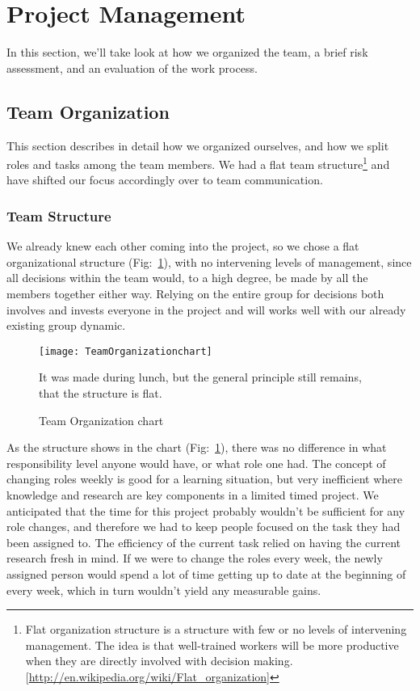 \section{Project Management}\label{Project Management} 
    In this section, we'll take look at how we organized the team, a brief risk assessment, and an evaluation of the work process. 
    
    \subsection{Team Organization}\label{Team Organization} 
        This section describes in detail how we organized ourselves, and how we split roles and tasks among the team members. We had a flat team structure\footnote{Flat organization structure is a structure with few or no levels of intervening management. The idea is that well-trained workers will be more productive when they are directly involved with decision making. [\url{http://en.wikipedia.org/wiki/Flat_organization}]}  and have shifted our focus accordingly over to team communication. 
    
    \subsubsection{Team Structure}\label{Team Structure}
    We already knew each other coming into the project, so we chose a flat organizational structure (Fig:~\ref{fig:TeamOrganizationchart}), with no intervening levels of management, since all decisions within the team would, to a high degree, be made by all the members together either way. Relying on the entire group for decisions both involves and invests everyone in the project and will works well with our already existing group dynamic.

    \begin{figure}[H]
        \centering
        \texttt{[image: TeamOrganizationchart]}
        \caption{Team Organization chart}
        It was made during lunch, but the general principle still remains, that the structure is flat.
        \label{fig:TeamOrganizationchart}
    \end{figure}
    
    As the structure shows in the chart (Fig:~\ref{fig:TeamOrganizationchart}), there was no difference in what responsibility level anyone would have, or what role one had. The concept of changing roles weekly is good for a learning situation, but very inefficient where knowledge and research are key components in a limited timed project. We anticipated that the time for this project probably wouldn't be sufficient for any role changes, and therefore we had to keep people focused on the task they had been assigned to. The efficiency of the current task relied on having the current research fresh in mind. If we were to change the roles every week, the newly assigned person would spend a lot of time getting up to date at the beginning of every week, which in turn wouldn't yield any measurable gains. 
    
